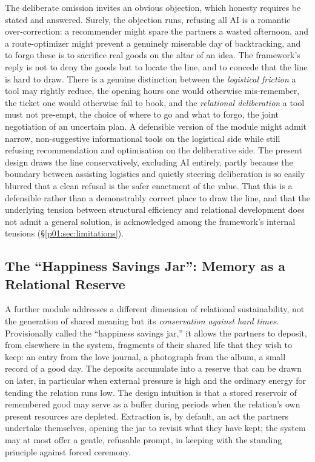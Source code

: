 \documentclass[11pt,a4paper]{article}
\begin{document}
The deliberate omission invites an obvious objection, which honesty requires be stated and answered. Surely, the objection runs, refusing all AI is a romantic over-correction: a recommender might spare the partners a wasted afternoon, and a route-optimizer might prevent a genuinely miserable day of backtracking, and to forgo these is to sacrifice real goods on the altar of an idea. The framework's reply is not to deny the goods but to locate the line, and to concede that the line is hard to draw. There is a genuine distinction between the \emph{logistical friction} a tool may rightly reduce, the opening hours one would otherwise mis-remember, the ticket one would otherwise fail to book, and the \emph{relational deliberation} a tool must not pre-empt, the choice of where to go and what to forgo, the joint negotiation of an uncertain plan. A defensible version of the module might admit narrow, non-suggestive informational tools on the logistical side while still refusing recommendation and optimisation on the deliberative side. The present design draws the line conservatively, excluding AI entirely, partly because the boundary between assisting logistics and quietly steering deliberation is so easily blurred that a clean refusal is the safer enactment of the value. That this is a defensible rather than a demonstrably correct place to draw the line, and that the underlying tension between structural efficiency and relational development does not admit a general solution, is acknowledged among the framework's internal tensions (§\ref{p01:sec:limitations}).

\subsection{The ``Happiness Savings Jar'': Memory as a Relational Reserve}\label{p01:sec:savingsjar}

A further module addresses a different dimension of relational sustainability, not the generation of shared meaning but its \emph{conservation against hard times}. Provisionally called the ``happiness savings jar,'' it allows the partners to deposit, from elsewhere in the system, fragments of their shared life that they wish to keep: an entry from the love journal, a photograph from the album, a small record of a good day. The deposits accumulate into a reserve that can be drawn on later, in particular when external pressure is high and the ordinary energy for tending the relation runs low. The design intuition is that a stored reservoir of remembered good may serve as a buffer during periods when the relation's own present resources are depleted. Extraction is, by default, an act the partners undertake themselves, opening the jar to revisit what they have kept; the system may at most offer a gentle, refusable prompt, in keeping with the standing principle against forced ceremony.
\end{document}
